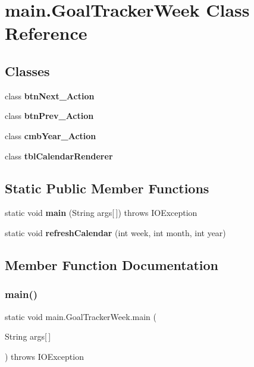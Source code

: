 \section{main.\+Goal\+Tracker\+Week Class Reference}
\label{classmain_1_1_goal_tracker_week}
\subsection*{Classes}
\begin{DoxyCompactItemize}
\item 
class {\bfseries btn\+Next\+\_\+\+Action}
\item 
class {\bfseries btn\+Prev\+\_\+\+Action}
\item 
class {\bfseries cmb\+Year\+\_\+\+Action}
\item 
class {\bfseries tbl\+Calendar\+Renderer}
\end{DoxyCompactItemize}
\subsection*{Static Public Member Functions}
\begin{DoxyCompactItemize}
\item 
static void \textbf{ main} (String args[$\,$])  throws I\+O\+Exception 
\item 
static void \textbf{ refresh\+Calendar} (int week, int month, int year)
\end{DoxyCompactItemize}


\subsection{Member Function Documentation}
\mbox{\label{classmain_1_1_goal_tracker_week_a03418a3f1ae0a64e023b764cdba2fedb}} 
\subsubsection{main()}
{\footnotesize\ttfamily static void main.\+Goal\+Tracker\+Week.\+main (\begin{DoxyParamCaption}\item[{String}]{args[$\,$] }\end{DoxyParamCaption}) throws I\+O\+Exception\hspace{0.3cm}{\ttfamily [static]}}

